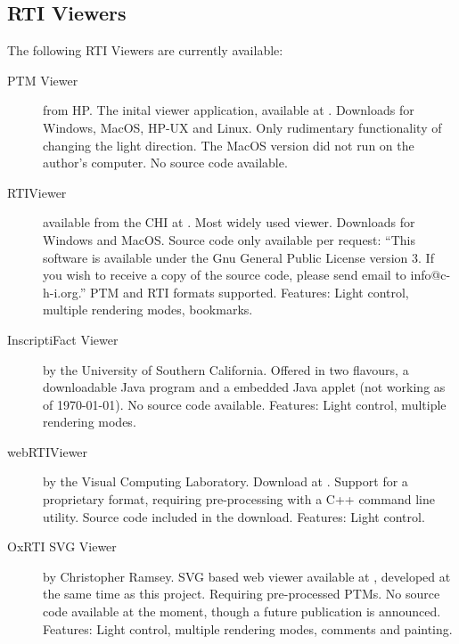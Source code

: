 \subsection{RTI Viewers}
The following RTI Viewers are currently available:
\begin{description}
\item[PTM Viewer]  from HP. The inital viewer application, available at
  \cite*{noauthor_hp_nodate}. Downloads for Windows, MacOS, HP-UX and Linux.
  Only rudimentary functionality of changing the light direction. The MacOS
  version did not run on the author's computer. No source code available.
\item[RTIViewer] available from the CHI at \cite*{noauthor_cultural_nodate-1}.
  Most widely used viewer. Downloads for Windows and MacOS\@. Source code only available per request:
  ``This software is available under the Gnu General Public License version 3.
  If you wish to receive a copy of the source code, please send email to
  info@c-h-i.org.'' PTM and RTI formats supported. Features: Light control, multiple rendering
  modes, bookmarks.
\item[InscriptiFact Viewer] by the University of Southern California. Offered in two flavours, a downloadable Java
  program\cite*{noauthor_inscriptifact_nodate-1} and a embedded Java
  applet\cite*{noauthor_inscriptifact_nodate} (not working as of \today). No
  source code available. Features: Light control, multiple rendering modes.
\item[webRTIViewer] by the Visual Computing Laboratory. Download at
  \cite*{noauthor_reflectance_nodate}. Support for a proprietary format,
  requiring pre-processing with a C++ command line utility. Source code
  included in the download. Features: Light control.
\item[OxRTI SVG Viewer] by Christopher Ramsey. SVG based web viewer available at
  \cite*{noauthor_oxrti_nodate}, developed at the same time as this project.
  Requiring pre-processed PTMs. No source code available at the moment, though a future
  publication is announced. Features: Light control, multiple rendering modes,
  comments and painting.
\end{description}
